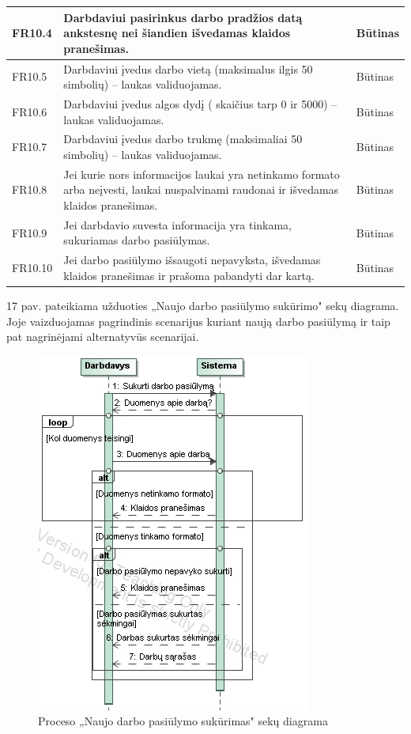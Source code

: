\documentclass{VUMIFPSkursinis}
\begin{document}
\begin{table}[H]
\centering
\normalsize
\begin{tabular}{|p{2cm}|p{10cm}|p{3cm}|}
\hline
FR10.4 & \multicolumn{1}{m{10cm}|}{Darbdaviui pasirinkus darbo pradžios datą ankstesnę nei šiandien išvedamas klaidos pranešimas.} & Būtinas \\ \hline
FR10.5 & \multicolumn{1}{m{10cm}|}{Darbdaviui įvedus darbo vietą (maksimalus ilgis 50 simbolių) – laukas validuojamas.} & Būtinas \\ \hline
FR10.6 & \multicolumn{1}{m{10cm}|}{Darbdaviui įvedus algos dydį ( skaičius tarp 0 ir 5000) – laukas validuojamas.} & Būtinas \\ \hline
FR10.7 & \multicolumn{1}{m{10cm}|}{Darbdaviui įvedus darbo trukmę (maksimaliai 50 simbolių) – laukas validuojamas.} & Būtinas \\ \hline
FR10.8 & \multicolumn{1}{m{10cm}|}{Jei kurie nors informacijos laukai yra netinkamo formato arba neįvesti, laukai nuspalvinami raudonai ir išvedamas klaidos pranešimas.} & Būtinas \\ \hline
FR10.9 & \multicolumn{1}{m{10cm}|}{Jei darbdavio suvesta informacija yra tinkama, sukuriamas darbo pasiūlymas.} & Būtinas \\
\hline
FR10.10 & \multicolumn{1}{m{10cm}|}{Jei darbo pasiūlymo išsaugoti nepavyksta, išvedamas klaidos pranešimas ir prašoma pabandyti dar kartą.} & Būtinas \\ \hline
\end{tabular}
\end{table}
17 pav. pateikiama užduoties „Naujo darbo pasiūlymo sukūrimo" sekų diagrama. Joje vaizduojamas pagrindinis  scenarijus kuriant naują darbo pasiūlymą ir taip pat nagrinėjami alternatyvūs scenarijai.
\begin{figure}[H]
\centering
\includegraphics[scale=1, frame]{img/sukurtiDarba.png}
\caption{Proceso „Naujo darbo pasiūlymo sukūrimas" sekų diagrama}
\end{figure}
\end{document}
